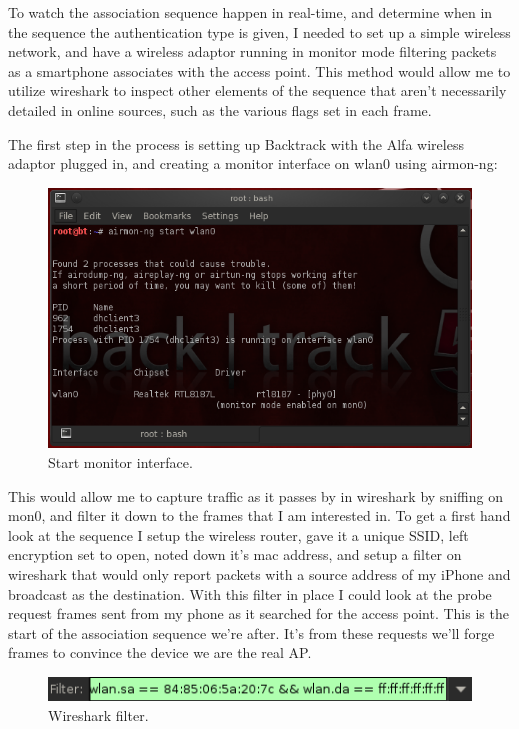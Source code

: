 To watch the association sequence happen in real-time, and determine when in the sequence the authentication type is given, I needed to set up a simple wireless network, and have a wireless adaptor running in monitor mode filtering packets as a smartphone associates with the access point. This method would allow me to utilize wireshark to inspect other elements of the sequence that aren’t necessarily detailed in online sources, such as the various flags set in each frame.

The first step in the process is setting up Backtrack with the Alfa wireless adaptor plugged in, and creating a monitor interface on wlan0 using airmon-ng:

\begin{figure}[h!]
\includegraphics[width=\linewidth]{research/80211/figures/bt1.png}
\caption{Start monitor interface.}
\label{research:80211:bt1}
\end{figure}

This would allow me to capture traffic as it passes by in wireshark by sniffing on mon0, and filter it down to the frames that I am interested in. To get a first hand look at the sequence I setup the wireless router, gave it a unique SSID, left encryption set to open, noted down it’s mac address, and setup a filter on wireshark that would only report packets with a source address of my iPhone and broadcast as the destination. With this filter in place I could look at the probe request frames sent from my phone as it searched for the access point. This is the start of the association sequence we’re after. It’s from these requests we’ll forge frames to convince the device we are the real AP.

\begin{figure}[h!]
\includegraphics[width=\linewidth]{research/80211/figures/bt2.png}
\caption{Wireshark filter.}
\label{research:80211:bt2}
\end{figure}

